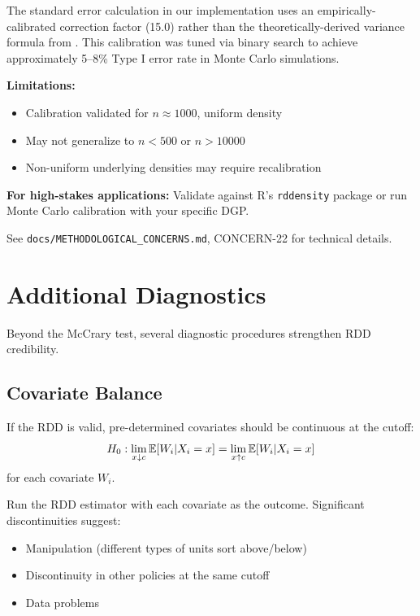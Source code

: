 \begin{remark}
The standard error calculation in our implementation uses an empirically-calibrated
correction factor (15.0) rather than the theoretically-derived variance formula
from \citet{cattaneo2020simple}. This calibration was tuned via binary search to
achieve approximately 5--8\% Type I error rate in Monte Carlo simulations.

\textbf{Limitations:}
\begin{itemize}
    \item Calibration validated for $n \approx 1000$, uniform density
    \item May not generalize to $n < 500$ or $n > 10000$
    \item Non-uniform underlying densities may require recalibration
\end{itemize}

\textbf{For high-stakes applications:} Validate against R's \texttt{rddensity} package
or run Monte Carlo calibration with your specific DGP.

See \texttt{docs/METHODOLOGICAL\_CONCERNS.md}, CONCERN-22 for technical details.
\end{remark}

\section{Additional Diagnostics}
\label{sec:rdd_diagnostics}

Beyond the McCrary test, several diagnostic procedures strengthen RDD credibility.

\subsection{Covariate Balance}

\begin{definition}
If the RDD is valid, pre-determined covariates should be continuous at the cutoff:
\begin{equation}
    H_0: \lim_{x \downarrow c} \mathbb{E}[W_i | X_i = x] = \lim_{x \uparrow c} \mathbb{E}[W_i | X_i = x]
\end{equation}
for each covariate $W_i$.
\end{definition}

Run the RDD estimator with each covariate as the outcome. Significant discontinuities suggest:
\begin{itemize}
    \item Manipulation (different types of units sort above/below)
    \item Discontinuity in other policies at the same cutoff
    \item Data problems
\end{itemize}

